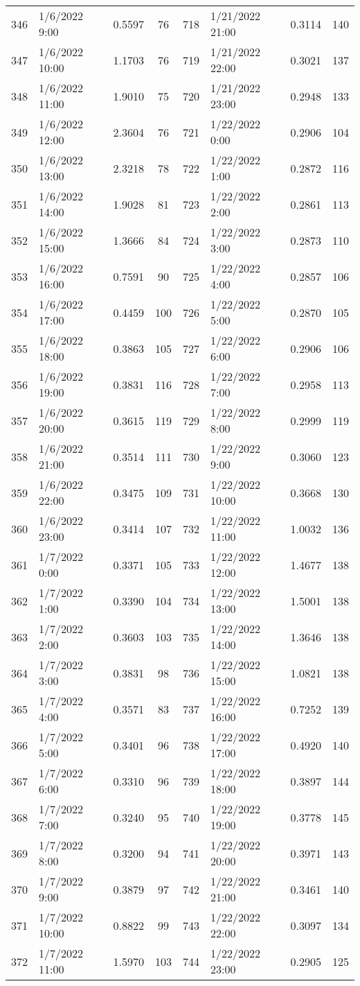 \begin{center}
\begin{longtable}{llccllcc}
    346&1/6/2022 9:00	   &0.5597&76 &718&1/21/2022 21:00	    &0.3114&140 \\
    347&1/6/2022 10:00	   &1.1703&76 &719&1/21/2022 22:00	    &0.3021&137 \\
    348&1/6/2022 11:00	   &1.9010&75 &720&1/21/2022 23:00	    &0.2948&133 \\
    349&1/6/2022 12:00	   &2.3604&76 &721&1/22/2022 0:00	    &0.2906&104 \\
    350&1/6/2022 13:00	   &2.3218&78 &722&1/22/2022 1:00	    &0.2872&116 \\
    351&1/6/2022 14:00	   &1.9028&81 &723&1/22/2022 2:00	    &0.2861&113 \\
    352&1/6/2022 15:00	   &1.3666&84 &724&1/22/2022 3:00	    &0.2873&110 \\
    353&1/6/2022 16:00	   &0.7591&90 &725&1/22/2022 4:00	    &0.2857&106 \\
    354&1/6/2022 17:00	   &0.4459&100&726&1/22/2022 5:00	    &0.2870&105 \\
    355&1/6/2022 18:00	   &0.3863&105&727&1/22/2022 6:00	    &0.2906&106 \\
    356&1/6/2022 19:00	   &0.3831&116&728&1/22/2022 7:00	    &0.2958&113 \\
    357&1/6/2022 20:00	   &0.3615&119&729&1/22/2022 8:00	    &0.2999&119 \\
    358&1/6/2022 21:00	   &0.3514&111&730&1/22/2022 9:00	    &0.3060&123 \\
    359&1/6/2022 22:00	   &0.3475&109&731&1/22/2022 10:00	&0.3668&130 \\
    360&1/6/2022 23:00	   &0.3414&107&732&1/22/2022 11:00	&1.0032&136 \\
    361&1/7/2022 0:00	   &0.3371&105&733&1/22/2022 12:00	&1.4677&138 \\
    362&1/7/2022 1:00	   &0.3390&104&734&1/22/2022 13:00	&1.5001&138 \\
    363&1/7/2022 2:00	   &0.3603&103&735&1/22/2022 14:00	&1.3646&138 \\
    364&1/7/2022 3:00	   &0.3831&98 &736&1/22/2022 15:00	&1.0821&138 \\
    365&1/7/2022 4:00	   &0.3571&83 &737&1/22/2022 16:00	&0.7252&139 \\
    366&1/7/2022 5:00	   &0.3401&96 &738&1/22/2022 17:00	&0.4920&140 \\
    367&1/7/2022 6:00	   &0.3310&96 &739&1/22/2022 18:00	&0.3897&144 \\
    368&1/7/2022 7:00	   &0.3240&95 &740&1/22/2022 19:00	&0.3778&145 \\
    369&1/7/2022 8:00	   &0.3200&94 &741&1/22/2022 20:00	&0.3971&143 \\
    370&1/7/2022 9:00	   &0.3879&97 &742&1/22/2022 21:00	&0.3461&140 \\
    371&1/7/2022 10:00	   &0.8822&99 &743&1/22/2022 22:00	&0.3097&134 \\
    372&1/7/2022 11:00	   &1.5970&103&744&1/22/2022 23:00	&0.2905&125 \\

\end{longtable}
\end{center}


